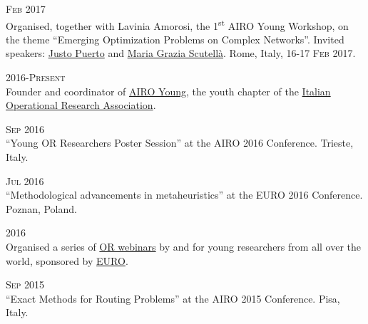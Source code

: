 \begin{paracol}{2}
  \textsc{Feb 2017}
\switchcolumn
  \\
    Organised, together with Lavinia Amorosi, the 1\textsuperscript{st} AIRO Young Workshop, on the theme ``Emerging Optimization Problems on Complex Networks''.
    Invited speakers: \href{http://scholar.google.com/citations?user=koF66usAAAAJ}{Justo Puerto} and \href{http://scholar.google.com/citations?user=PcGjfV8AAAAJ}{Maria Grazia Scutellà}.
    Rome, Italy, \textsc{16-17 Feb 2017}.
\end{paracol}

\begin{paracol}{2}
  \textsc{2016-Present}
\switchcolumn
  \\
  Founder and coordinator of \href{http://airoyoung.org}{AIRO Young}, the youth chapter of the \href{http://www.airo.org}{Italian Operational Research Association}.
\end{paracol}

\begin{paracol}{2}
  \textsc{Sep 2016}
\switchcolumn
  \\
  ``Young OR Researchers Poster Session'' at the AIRO 2016 Conference.
  Trieste, Italy.
\end{paracol}

\begin{paracol}{2}
  \textsc{Jul 2016}
\switchcolumn
  \\
  ``Methodological advancements in metaheuristics'' at the EURO 2016 Conference.
  Poznan, Poland.
\end{paracol}

\begin{paracol}{2}
    \textsc{2016}
\switchcolumn
  \\
  Organised a series of \href{http://santini.in/seminars}{OR webinars} by and for young researchers from all over the world, sponsored by \href{http://euro-online.org}{EURO}.
\end{paracol}

\begin{paracol}{2}
  \textsc{Sep 2015}
\switchcolumn
  \\
  ``Exact Methods for Routing Problems'' at the AIRO 2015 Conference.
  Pisa, Italy.
\end{paracol}

